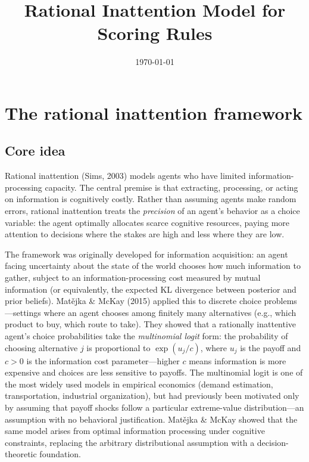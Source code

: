 \documentclass[11pt]{article}
\title{Rational Inattention Model for Scoring Rules}
\author{}
\date{\today}
\begin{document}
\maketitle

\section{The rational inattention framework}

\subsection{Core idea}

Rational inattention (Sims, 2003) models agents who have limited information-processing capacity. The central premise is that extracting, processing, or acting on information is cognitively costly. Rather than assuming agents make random errors, rational inattention treats the \emph{precision} of an agent's behavior as a choice variable: the agent optimally allocates scarce cognitive resources, paying more attention to decisions where the stakes are high and less where they are low.

The framework was originally developed for information acquisition: an agent facing uncertainty about the state of the world chooses how much information to gather, subject to an information-processing cost measured by mutual information (or equivalently, the expected KL divergence between posterior and prior beliefs). Mat\v{e}jka \& McKay (2015) applied this to discrete choice problems---settings where an agent chooses among finitely many alternatives (e.g., which product to buy, which route to take). They showed that a rationally inattentive agent's choice probabilities take the \emph{multinomial logit} form: the probability of choosing alternative $j$ is proportional to $\exp(u_j / c)$, where $u_j$ is the payoff and $c > 0$ is the information cost parameter---higher $c$ means information is more expensive and choices are less sensitive to payoffs. The multinomial logit is one of the most widely used models in empirical economics (demand estimation, transportation, industrial organization), but had previously been motivated only by assuming that payoff shocks follow a particular extreme-value distribution---an assumption with no behavioral justification. Mat\v{e}jka \& McKay showed that the same model arises from optimal information processing under cognitive constraints, replacing the arbitrary distributional assumption with a decision-theoretic foundation.
\end{document}
